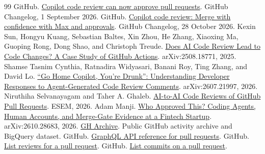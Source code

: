 \documentclass[11pt,letterpaper]{article}
\begin{document}
\begin{thebibliography}{99}
\small
\setlength{\itemsep}{2pt}
GitHub. \href{https://github.blog/changelog/2026-09-01-copilot-code-review-can-now-approve-pull-requests/}
{Copilot code review can now approve pull requests}. GitHub Changelog,
1 September 2026.
GitHub. \href{https://github.blog/changelog/2026-10-28-copilot-code-review-merge-with-confidence-with-max-and-approvals/}
{Copilot code review: Merge with confidence with Max and approvals}.
GitHub Changelog, 28 October 2026.
Kexin Sun, Hongyu Kuang, Sebastian Baltes, Xin Zhou, He Zhang, Xiaoxing Ma,
Guoping Rong, Dong Shao, and Christoph Treude.
\href{https://arxiv.org/abs/2508.18771}{Does AI Code Review Lead to Code Changes?
A Case Study of GitHub Actions}. arXiv:2508.18771, 2025.
Shamse Tasnim Cynthia, Ratnadira Widyasari, Banani Roy, Ting Zhang, and David Lo.
\href{https://arxiv.org/abs/2607.21997}{\textquotedblleft Go Home Copilot,
You're Drunk\textquotedblright: Understanding Developer Responses to
Agent-Generated Code Review Comments}. arXiv:2607.21997, 2026.
Niruthiha Selvanayagam and Taher A. Ghaleb.
\href{https://doi.org/10.4230/LIPIcs.ESEM.2026.75}{AI-to-AI Code Reviews of
GitHub Pull Requests}. ESEM, 2026.
Adam Manji. \href{https://arxiv.org/abs/2610.28683}{Who Approved This?
Coding Agents, Human Accounts, and Merge-Gate Evidence at a Fintech Startup}.
arXiv:2610.28683, 2026.
\href{https://www.gharchive.org/}{GH Archive}.
Public GitHub activity archive and BigQuery dataset.
GitHub. \href{https://docs.github.com/en/graphql/reference/objects\#pullrequest}
{GraphQL API reference for pull requests}.
GitHub. \href{https://docs.github.com/en/rest/pulls/reviews\#list-reviews-for-a-pull-request}
{List reviews for a pull request}.
GitHub. \href{https://docs.github.com/en/rest/pulls/pulls\#list-commits-on-a-pull-request}
{List commits on a pull request}.
\end{thebibliography}
\end{document}
